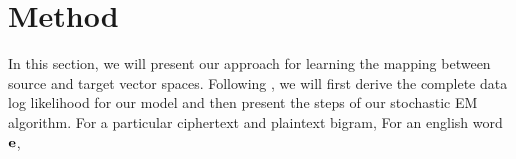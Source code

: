 \section{Method}
In this section, we will present our approach for learning the mapping between source and target vector spaces. Following \cite{mimno2012topic}, we will first derive the complete data log likelihood for our model and then present the steps of our stochastic EM algorithm. For a particular ciphertext and plaintext bigram, For an english word $\mathbf{e}$, 

